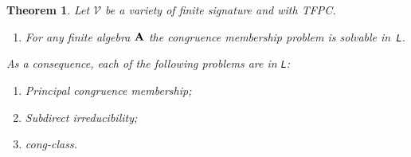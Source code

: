 \documentclass[reqno]{amsart}
\theoremstyle{plain}
\newtheorem{thm}{Theorem}[section]
\theoremstyle{definition}
\newcommand{\congclass}{\textsf{cong-class}}
\newcommand{\up}[1]{\textup{#1}}
\begin{document}
\begin{thm}\label{thm:TFPC}
Let $\mathscr{V}$ be a variety of finite signature and with TFPC.  
\begin{enumerate}
\item[(0)] For any finite algebra ${\bf A}$ the \textsf{congruence membership} problem is solvable in~\texttt{L}.
\end{enumerate}  
As a consequence, each of the following problems are in \texttt{L}\up:
\begin{enumerate}
\item \textsf{Principal congruence membership}\up;
\item \textsf{Subdirect irreducibility}\up;
\item \congclass.
\end{enumerate}
\end{thm}
\end{document}
